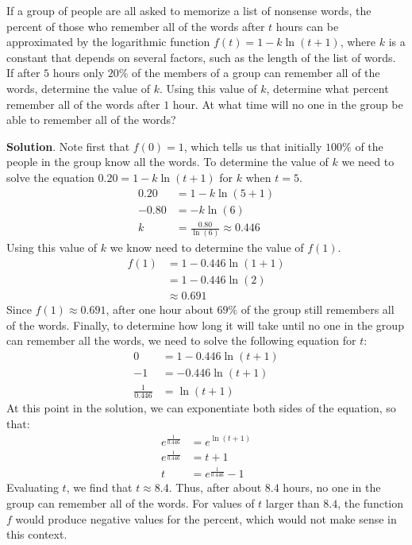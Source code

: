 \documentclass[10pt,]{book}
\theoremstyle{ptxdefinitionnotitle}
\theoremstyle{ptxdefinitiontitle}
\theoremstyle{ptxdefinitionnotitle}
\theoremstyle{ptxdefinitiontitle}
\theoremstyle{ptxdefinitionnotitle}
\theoremstyle{ptxdefinitiontitle}
\numberwithin{equation}{section}
\newcommand{\amp}{&}
\begin{document}
\begin{example}\label{example-31}
\hypertarget{p-376}{}%
If a group of people are all asked to memorize a list of nonsense words, the percent of those who remember all of the words after \(t\) hours can be approximated by the logarithmic function \(f(t) = 1 - k\ln \left( t + 1 \right)\), where \(k\) is a constant that depends on several factors, such as the length of the list of words.  If after \(5\) hours only \(20\%\) of the members of a group can remember all of the words, determine the value of \(k\). Using this value of \(k\), determine what percent remember all of the words after \(1\) hour. At what time will no one in the group be able to remember all of the words?%
\par\smallskip%
\noindent\textbf{Solution}.\hypertarget{solution-31}{}\quad%
\hypertarget{p-377}{}%
Note first that \(f(0) = 1\), which tells us that initially \(100\%\) of the people in the group know all the words. To determine the value of \(k\) we need to solve the equation \(0.20 = 1 - k \ln \left( t + 1 \right)\) for \(k\) when \(t = 5\).%
\begin{align*}
0.20 \amp = 1 - k \ln \left( 5 + 1 \right)\\
-0.80 \amp = -k \ln \left( 6 \right)\\
k \amp = \frac{0.80}{\ln(6)} \approx 0.446
\end{align*}
Using this value of \(k\) we know need to determine the value of \(f(1)\).%
\begin{align*}
f(1) \amp = 1 - 0.446 \ln \left( 1 + 1 \right)\\
\amp = 1 - 0.446 \ln \left( 2 \right)\\
\amp \approx 0.691
\end{align*}
Since \(f(1) \approx 0.691\), after one hour about \(69\%\) of the group still remembers all of the words. Finally, to determine how long it will take until no one in the group can remember all the words, we need to solve the following equation for \(t\):%
\begin{align*}
0 \amp = 1 - 0.446 \ln \left( t + 1 \right)\\
-1 \amp = -0.446 \ln \left( t + 1 \right)\\
\frac{1}{0.446} \amp = \ln \left( t + 1 \right)
\end{align*}
At this point in the solution, we can exponentiate both sides of the equation, so that:%
\begin{align*}
e^{ \frac{1}{0.446}} \amp = e^{\ln \left( t + 1 \right)}\\
e^{ \frac{1}{0.446}} \amp = t + 1\\
t \amp = e^{ \frac{1}{0.446}} - 1
\end{align*}
Evaluating \(t\), we find that \(t \approx 8.4\). Thus, after about \(8.4\) hours, no one in the group can remember all of the words. For values of \(t\) larger than \(8.4\), the function \(f\) would produce negative values for the percent, which would not make sense in this context.%
\end{example}
\typeout{************************************************}
\typeout{************************************************}
\end{document}
